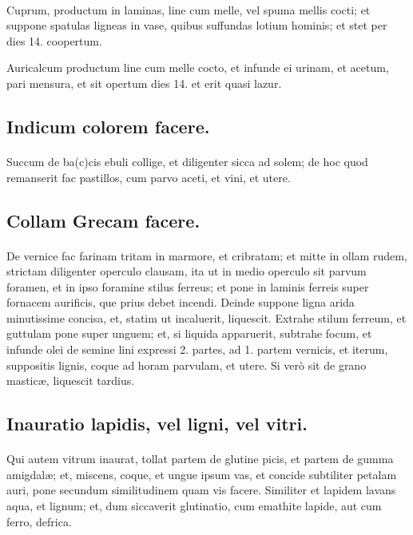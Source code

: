 \documentclass[a4paper, 11pt, oneside, polutonikogreek, italian]{article}
\begin{document}
\paragraph{}
Cuprum, productum in laminas, line cum melle, vel spuma mellis cocti; et suppone spatulas ligneas in vase, quibus suffundas lotium hominis; et stet per dies 14. coopertum.

Auricalcum productum line cum melle cocto, et infunde ei urinam, et acetum, pari mensura, et sit opertum dies 14. et erit quasi lazur.

\subsection{Indicum colorem facere.}
\paragraph{}
Succum de ba(c)cis ebuli collige, et diligenter sicca ad solem; de hoc quod remanserit fac pastillos, cum parvo aceti, et vini, et utere.

\subsection{Collam Grecam facere.}
\paragraph{}
De vernice fac farinam tritam in marmore, et cribratam; et mitte in ollam rudem, strictam diligenter operculo clausam, ita ut in medio operculo sit parvum foramen, et in ipso foramine stilus ferreus; et pone in laminis ferreis super fornacem aurificis, que prius debet incendi. Deinde suppone ligna arida minutissime concisa, et, statim ut incaluerit, liquescit. Extrahe stilum ferreum, et guttulam pone super unguem; et, si liquida apparuerit, subtrahe focum, et infunde olei de semine lini expressi 2. partes, ad 1. partem vernicis, et iterum, suppositis lignis, coque ad horam parvulam, et utere. Si verò sit de grano masticæ, liquescit tardius.

\subsection{Inauratio lapidis, vel ligni, vel vitri.}
\paragraph{}
Qui autem vitrum inaurat, tollat partem de glutine picis, et partem de gumma amigdalæ; et, miscens, coque, et ungue ipsum vas, et concide subtiliter petalam auri, pone secundum similitudinem quam vis facere. Similiter et lapidem lavans aqua, et lignum; et, dum siccaverit glutinatio, cum emathite lapide, aut cum ferro, defrica.
\end{document}
